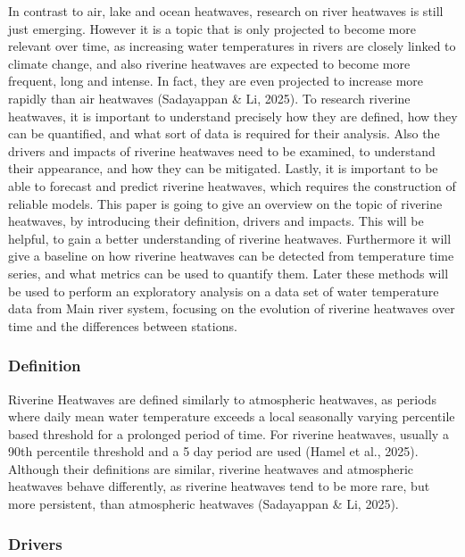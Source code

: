 \documentclass[
]{article}
\begin{document}
In contrast to air, lake and ocean heatwaves, research on river
heatwaves is still just emerging. However it is a topic that is only
projected to become more relevant over time, as increasing water
temperatures in rivers are closely linked to climate change, and also
riverine heatwaves are expected to become more frequent, long and
intense. In fact, they are even projected to increase more rapidly than
air heatwaves (Sadayappan \& Li, 2025). To research riverine heatwaves,
it is important to understand precisely how they are defined, how they
can be quantified, and what sort of data is required for their analysis.
Also the drivers and impacts of riverine heatwaves need to be examined,
to understand their appearance, and how they can be mitigated. Lastly,
it is important to be able to forecast and predict riverine heatwaves,
which requires the construction of reliable models. This paper is going
to give an overview on the topic of riverine heatwaves, by introducing
their definition, drivers and impacts. This will be helpful, to gain a
better understanding of riverine heatwaves. Furthermore it will give a
baseline on how riverine heatwaves can be detected from temperature time
series, and what metrics can be used to quantify them. Later these
methods will be used to perform an exploratory analysis on a data set of
water temperature data from Main river system, focusing on the evolution
of riverine heatwaves over time and the differences between stations.

\subsubsection{Definition}\label{definition}

Riverine Heatwaves are defined similarly to atmospheric heatwaves, as
periods where daily mean water temperature exceeds a local seasonally
varying percentile based threshold for a prolonged period of time. For
riverine heatwaves, usually a 90th percentile threshold and a 5 day
period are used (Hamel et al., 2025). Although their definitions are
similar, riverine heatwaves and atmospheric heatwaves behave
differently, as riverine heatwaves tend to be more rare, but more
persistent, than atmospheric heatwaves (Sadayappan \& Li, 2025).

\subsubsection{Drivers}\label{drivers}
\end{document}
